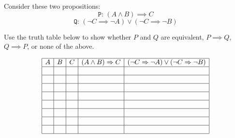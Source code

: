 \documentclass[12pt,oneside]{article}
\begin{document}
\begin{problem}{10}

Consider these two propositions:
$$\texttt{P: } (A \wedge B) \implies C$$
$$\texttt{Q: } (\neg C \implies \neg A) \vee (\neg C \implies \neg B)$$ 

Use the truth table below to show whether $P$ and $Q$ are equivalent, $P \implies Q$, $Q \implies P$, or none of the above.

%
\[
\begin{array}{|c|c|c|c|c|}
\hline
A & B & C & (A \wedge B) \implies C & (\neg C \implies \neg A) \vee (\neg C \implies \neg B) \\ \hline
& & & & \\ \hline
& & & & \\ \hline
& & & & \\ \hline
& & & & \\ \hline
& & & & \\ \hline
& & & & \\ \hline
& & & & \\ \hline
& & & & \\ \hline
\end{array}
\]
%

%

\end{problem}

\newpage
\end{document}
